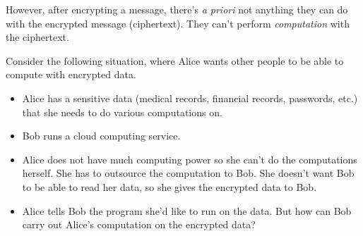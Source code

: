 However, after encrypting a message, there's {\it a priori} not anything they can do with the encrypted message (ciphertext). They can't perform {\it computation} with the ciphertext.

Consider the following situation, where Alice wants other people to be able to compute with encrypted data.
\begin{itemize}
\item
Alice has a sensitive data (medical records, financial records, passwords, etc.) that she needs to do various computations on. 
\item
Bob runs a cloud computing service. 
\item
Alice does not have much computing power so she can't do the computations herself. She has to outsource the computation to Bob. She doesn't want Bob to be able to read her data, so she gives the encrypted data to Bob.
\item
Alice tells Bob the program she'd like to run on the data. But how can Bob carry out Alice's computation on the encrypted data?
\end{itemize}

